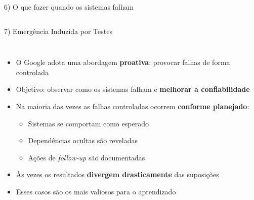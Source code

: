 \documentclass[aspectratio=169]{beamer}
\begin{document}
\begin{frame}{6) O que fazer quando os sistemas falham}
\begin{columns}[T]
  \end{columns}
\end{frame}

\begin{frame}{7) Emergência Induzida por Testes}

  \begin{columns}[T]
      \begin{itemize}
        \item O Google adota uma abordagem \textbf{proativa}: provocar falhas de forma controlada
        \item Objetivo: observar como os sistemas falham e \textbf{melhorar a confiabilidade}
        \item Na maioria das vezes as falhas controladas ocorrem \textbf{conforme planejado}:
          \begin{itemize}
            \item Sistemas se comportam como esperado
            \item Dependências ocultas são reveladas
            \item Ações de \textit{follow-up} são documentadas
          \end{itemize}
        \item Às vezes os resultados \textbf{divergem drasticamente} das suposições
        \item Esses casos são os mais valiosos para o aprendizado
      \end{itemize}


  \end{columns}
\end{frame}
\end{document}
